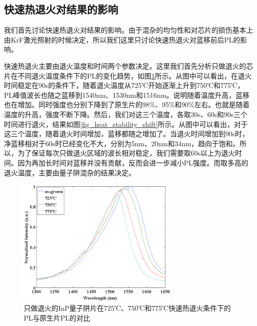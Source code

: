 \documentclass{ZJUthesis}
\begin{document}
\subsection{快速热退火对结果的影响}

我们首先讨论快速热退火对结果的影响。由于混杂的均匀性和对芯片的损伤基本上由KrF激光照射的时候决定，所以我们这里只讨论快速热退火对蓝移前后PL的影响。

快速热退火主要由退火温度和时间两个参数决定。这里我们首先分析只做退火的芯片在不同退火温度条件下的PL的变化趋势，如图\ref{fig_heat_stability}所示。从图中可以看出，在退火时间稳定在90s的条件下，随着退火温度从725℃开始逐渐上升到750℃和775℃，PL峰值波长也随之蓝移到1540nm、1530nm和1516nm。说明随着温度升高，蓝移也在增加。同时强度也分别下降到了原生片的98\%、95\%和90\%左右。也就是随着温度的升高，强度不断下降。然后，我们对这三个温度，各取30s、60s和90s三个时间进行退火，结果如图\ref{fig_heat_stability_shift}所示。从图中可以看出，对于这三个温度，随着退火时间增加，蓝移都随之增加了。当退火时间增加到90s时，净蓝移相对于60s时已经变化不大，分别为5nm、20nm和34nm，趋向于饱和。所以，为了保证每次只做退火区域的波长相对稳定，我们需要取60s以上为退火时间。因为再加长时间对蓝移并没有贡献，反而会进一步减小PL强度。而取多高的退火温度，主要由量子阱混杂的结果决定。

\begin{figure}[!t]
    \centering
    \includegraphics[width=0.7\textwidth]{./Pictures/heat_stability.eps}
    \caption{只做退火的InP量子阱片在725℃、750℃和775℃快速热退火条件下的PL与原生片PL的对比}
    \label{fig_heat_stability}
\end{figure}
\end{document}
